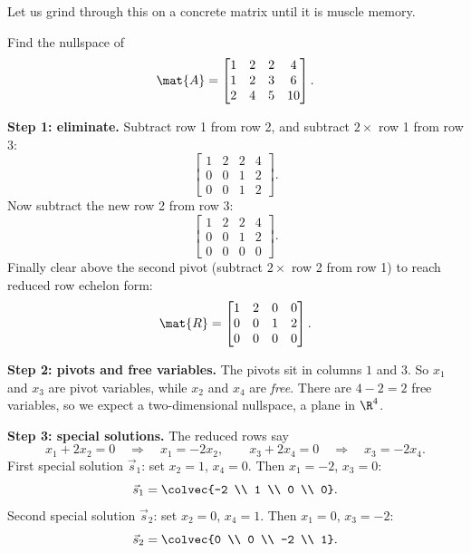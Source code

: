 Let us grind through this on a concrete matrix until it is muscle memory.

\begin{example}\label{ch12:big-null}
Find the nullspace of
\[
  \mat{A} = \begin{bmatrix}
    1 & 2 & 2 & 4 \\
    1 & 2 & 3 & 6 \\
    2 & 4 & 5 & 10
  \end{bmatrix}.
\]

\textbf{Step 1: eliminate.} Subtract row 1 from row 2, and subtract $2\times$ row
1 from row 3:
\[
  \begin{bmatrix}
    1 & 2 & 2 & 4 \\
    0 & 0 & 1 & 2 \\
    0 & 0 & 1 & 2
  \end{bmatrix}.
\]
Now subtract the new row 2 from row 3:
\[
  \begin{bmatrix}
    1 & 2 & 2 & 4 \\
    0 & 0 & 1 & 2 \\
    0 & 0 & 0 & 0
  \end{bmatrix}.
\]
Finally clear above the second pivot (subtract $2\times$ row 2 from row 1) to
reach reduced row echelon form:
\[
  \mat{R} = \begin{bmatrix}
    1 & 2 & 0 & 0 \\
    0 & 0 & 1 & 2 \\
    0 & 0 & 0 & 0
  \end{bmatrix}.
\]

\textbf{Step 2: pivots and free variables.} The pivots sit in columns $1$ and
$3$. So $x_1$ and $x_3$ are pivot variables, while $x_2$ and $x_4$ are
\emph{free}. There are $4-2=2$ free variables, so we expect a two-dimensional
nullspace, a plane in $\R^4$.

\textbf{Step 3: special solutions.} The reduced rows say
\[
  x_1 + 2x_2 = 0 \quad\Longrightarrow\quad x_1 = -2x_2,
  \qquad
  x_3 + 2x_4 = 0 \quad\Longrightarrow\quad x_3 = -2x_4.
\]
First special solution $\vec{s}_1$: set $x_2 = 1$, $x_4 = 0$. Then
$x_1 = -2$, $x_3 = 0$:
\[
  \vec{s}_1 = \colvec{-2 \\ 1 \\ 0 \\ 0}.
\]
Second special solution $\vec{s}_2$: set $x_2 = 0$, $x_4 = 1$. Then $x_1 = 0$,
$x_3 = -2$:
\[
  \vec{s}_2 = \colvec{0 \\ 0 \\ -2 \\ 1}.
\]


\end{example}
